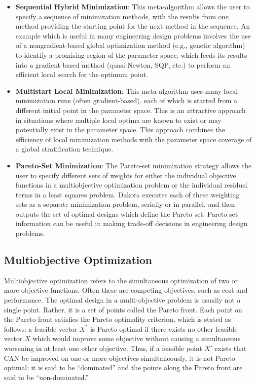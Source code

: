 \begin{itemize}
\item \textbf{Sequential Hybrid Minimization}: This meta-algorithm
  allows the user to specify a sequence of minimization methods, with
  the results from one method providing the starting point for the
  next method in the sequence. An example which is useful in many
  engineering design problems involves the use of a nongradient-based
  global optimization method (e.g., genetic algorithm) to identify a
  promising region of the parameter space, which feeds its results
  into a gradient-based method (quasi-Newton, SQP, etc.) to perform an
  efficient local search for the optimum point.

\item \textbf{Multistart Local Minimization}: This meta-algorithm uses
  many local minimization runs (often gradient-based), each of which
  is started from a different initial point in the parameter
  space. This is an attractive approach in situations where multiple
  local optima are known to exist or may potentially exist in the
  parameter space. This approach combines the efficiency of local
  minimization methods with the parameter space coverage of a global
  stratification technique.

\item \textbf{Pareto-Set Minimization}: The Pareto-set minimization
  strategy allows the user to specify different sets of weights for
  either the individual objective functions in a multiobjective
  optimization problem or the individual residual terms in a least
  squares problem. Dakota executes each of these weighting sets as a
  separate minimization problem, serially or in parallel, and then
  outputs the set of optimal designs which define the Pareto
  set. Pareto set information can be useful in making trade-off
  decisions in engineering design problems.
\end{itemize}

\subsection{Multiobjective Optimization}
\label{opt:additional:multiobjective}

Multiobjective optimization refers to the simultaneous optimization of
two or more objective functions. Often these are competing objectives,
such as cost and performance. The optimal design in a multi-objective
problem is usually not a single point. Rather, it is a set of points
called the Pareto front. Each point on the Pareto front satisfies the
Pareto optimality criterion, which is stated as follows: a feasible
vector $X^{*}$ is Pareto optimal if there exists no other feasible
vector $X$ which would improve some objective without causing a
simultaneous worsening in at least one other objective. Thus, if a
feasible point $X'$ exists that CAN be improved on one or more
objectives simultaneously, it is not Pareto optimal: it is said to be
``dominated'' and the points along the Pareto front are said to be
``non-dominated.''


